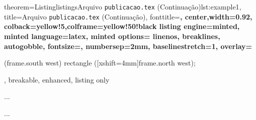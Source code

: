 \documentclass[10pt]{beamer}
\begin{document}
\begin{frame}{}
    \begin{tcblisting}{
        theorem={Listing}{listings}{Arquivo {\tt publicacao.tex} (Continuação)}{lst:example1},
        title=Arquivo {\tt publicacao.tex} (Continuação),
        fonttitle=\small\bfseries,
        center,width=0.92\paperwidth,
        colback=yellow!5,colframe=yellow!50!black
        listing engine=minted,
        minted language=latex,
        minted options={%
            linenos,
            breaklines,
            autogobble,
            fontsize=\small,
            numbersep=2mm,
            baselinestretch=1},
        overlay={%
        \begin{tcbclipinterior}
            \fill[gray!25] (frame.south west) rectangle ([xshift=4mm]frame.north west);
        \end{tcbclipinterior}},
        breakable, enhanced, listing only}
    ...
     
    
    
    \inicioApendice %
     
    
    \inicioAnexo
    
    
    
    
    \inicioIndice
    
    ...
    \end{tcblisting}
\end{frame}
\end{document}
